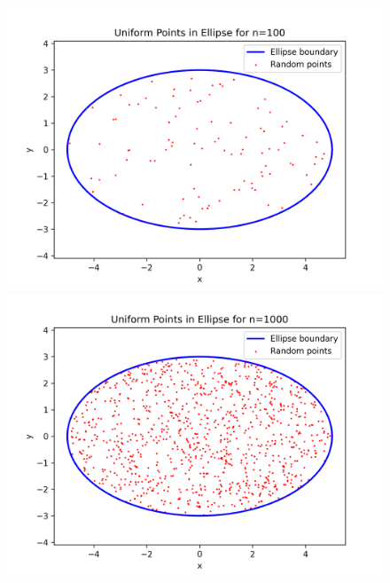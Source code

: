 \documentclass[a4paper,12pt]{article}
\begin{document}
\begin{figure}[h!]
    \centering
    \begin{minipage}{0.33\textwidth}
        \centering
        \includegraphics[width=\textwidth]{./Screenshots/Exercise5.1.png}
    \end{minipage}%
    \hfill
    \begin{minipage}{0.33\textwidth}
        \centering
        \includegraphics[width=\textwidth]{./Screenshots/Exercise5.2.png}
    \end{minipage}%
    \hfill
    \begin{minipage}{0.33\textwidth}
        \centering

\end{minipage}
\end{figure}
\end{document}

